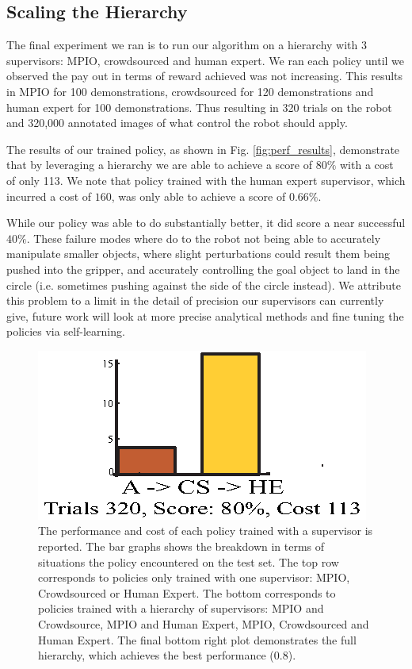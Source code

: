 \documentclass[10pt, conference]{ieeeconf}      %
\begin{document}
\subsection{Scaling the Hierarchy}
The final experiment we ran is to run our algorithm on a hierarchy with 3 supervisors: MPIO, crowdsourced and human expert. We ran each policy until we observed the pay out in terms of reward achieved was not increasing. This results in MPIO for 100 demonstrations, crowdsourced for 120 demonstrations and human expert for 100 demonstrations. Thus resulting in 320 trials on the robot and 320,000 annotated images of what control the robot should apply. 

The results of our trained policy, as shown in Fig. \ref{fig:perf_results}, demonstrate that by leveraging a hierarchy we are able to achieve a score of $80\%$ with a cost of only 113. We note that policy trained with the human expert supervisor, which incurred a cost of $160$, was only able to achieve a score of $0.66\%$. 

While our policy was able to do substantially better, it did score a near successful  $40\%$. These failure modes where do to the robot not being able to accurately manipulate smaller objects, where slight perturbations could result them being pushed into the gripper, and accurately controlling the goal object to land in the circle (i.e. sometimes pushing against the side of the circle instead). We attribute this problem to a limit in the detail of precision our supervisors can currently give, future work will look at more precise analytical methods and fine tuning the policies via self-learning. 


\begin{figure}[t]
\includegraphics{f_figs/big_data.eps}

\caption{ \footnotesize The performance and cost of each policy trained with a supervisor is reported. The bar graphs shows the breakdown in terms of situations the policy encountered on the test set. The top row corresponds to policies only trained with one supervisor: MPIO, Crowdsourced or Human Expert. The bottom corresponds to policies trained with a hierarchy of supervisors: MPIO and Crowdsource, MPIO and Human Expert, MPIO, Crowdsourced and Human Expert. The final bottom right plot demonstrates the full hierarchy, which achieves the best performance (0.8).   }
\vspace*{-20pt}
\label{fig:big_data}
\end{figure}
\end{document}
